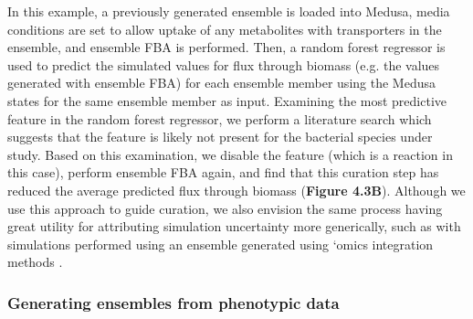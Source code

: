\documentclass[11pt,twocolumn,notitlepage,openany,twoside]{book}
\begin{document}
\begin{refsection}
In this example, a previously generated ensemble is loaded into Medusa, media conditions are set to allow uptake of any metabolites with transporters in the ensemble, and ensemble FBA is performed. Then, a random forest regressor is used to predict the simulated values for flux through biomass (e.g. the values generated with ensemble FBA) for each ensemble member using the Medusa states for the same ensemble member as input. Examining the most predictive feature in the random forest regressor, we perform a literature search which suggests that the feature is likely not present for the bacterial species under study. Based on this examination, we disable the feature (which is a reaction in this case), perform ensemble FBA again, and find that this curation step has reduced the average predicted flux through biomass (\textbf{Figure 4.3B}). Although we use this approach to guide curation, we also envision the same process having great utility for attributing simulation uncertainty more generically, such as with simulations performed using an ensemble generated using ‘omics integration methods \cite{Blazier2012-oo}.

\subsubsection{Generating ensembles from phenotypic data}


\end{refsection}
\end{document}
